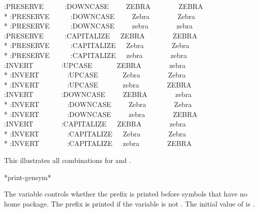 \begin{defun}[Variable]
\begin{newer}
\begin{lisp}
:PRESERVE~~~~~~:DOWNCASE~~~~~ZEBRA~~~~~~~~ZEBRA \\*
:PRESERVE~~~~~~:DOWNCASE~~~~~Zebra~~~~~~~~Zebra \\*
:PRESERVE~~~~~~:DOWNCASE~~~~~zebra~~~~~~~~zebra \\
:PRESERVE~~~~~~:CAPITALIZE~~~ZEBRA~~~~~~~~ZEBRA \\*
:PRESERVE~~~~~~:CAPITALIZE~~~Zebra~~~~~~~~Zebra \\*
:PRESERVE~~~~~~:CAPITALIZE~~~zebra~~~~~~~~zebra \\
:INVERT~~~~~~~~:UPCASE~~~~~~~ZEBRA~~~~~~~~zebra \\*
:INVERT~~~~~~~~:UPCASE~~~~~~~Zebra~~~~~~~~Zebra \\*
:INVERT~~~~~~~~:UPCASE~~~~~~~zebra~~~~~~~~ZEBRA \\
:INVERT~~~~~~~~:DOWNCASE~~~~~ZEBRA~~~~~~~~zebra \\*
:INVERT~~~~~~~~:DOWNCASE~~~~~Zebra~~~~~~~~Zebra \\*
:INVERT~~~~~~~~:DOWNCASE~~~~~zebra~~~~~~~~ZEBRA \\
:INVERT~~~~~~~~:CAPITALIZE~~~ZEBRA~~~~~~~~zebra \\*
:INVERT~~~~~~~~:CAPITALIZE~~~Zebra~~~~~~~~Zebra \\*
:INVERT~~~~~~~~:CAPITALIZE~~~zebra~~~~~~~~ZEBRA \\[\foo]
\end{lisp}

This illustrates all combinations for
 and .
\end{newer}
\end{defun}


\begin{defun}[Variable]
*print-gensym*

The  variable controls whether the prefix \cd{\#:}
is printed before symbols that have no home package.
The prefix is printed if the variable is not {\false}.
The initial value of  is {\true}.
\end{defun}

